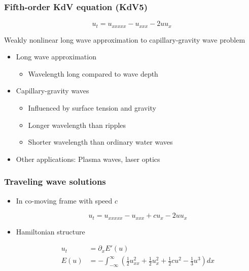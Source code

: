 \documentclass[16pt]{beamer}
\begin{document}
\begin{frame}
	\frametitle{Fifth-order KdV equation (KdV5)}   
	\fontsize{16}{7.2}\selectfont
	\begin{center}
		\[ u_t = u_{xxxxx} - u_{xxx} - 2 u u_x \]
	\end{center}
	\vspace{0.5cm}
	Weakly nonlinear long wave approximation to capillary-gravity wave problem
	\vspace{0.5cm}
	\begin{itemize}
		\item Long wave approximation
		\begin{itemize} 
			\item Wavelength long compared to wave depth
		\end{itemize}
		\item Capillary-gravity waves
		\begin{itemize}
		    \item Influenced by surface tension and gravity
		    \item Longer wavelength than ripples
		    \item Shorter wavelength than ordinary water waves 
		\end{itemize}
		\item Other applications: Plasma waves, laser optics
	\end{itemize}
\end{frame}

\begin{frame}
	\frametitle{Traveling wave solutions}
	\fontsize{16}{7.2}\selectfont
	\begin{itemize}
		\item In co-moving frame with speed $c$
		\begin{center}
		\[ u_t = u_{xxxxx} - u_{xxx} + c u_x - 2 u u_x \]
		\end{center}

		\item Hamiltonian structure
		\begin{center}
		\begin{align*} 
			u_t &= \partial_x E'(u) \\
			E(u) &= -\int_{-\infty}^{\infty} \left( \frac{1}{2}u_{xx}^2 + \frac{1}{2}u_x^2 + \frac{1}{2}cu^2 - \frac{1}{3}u^3 \right) dx 
		\end{align*}
		\end{center}
	\end{itemize}
\end{frame}
\end{document}
